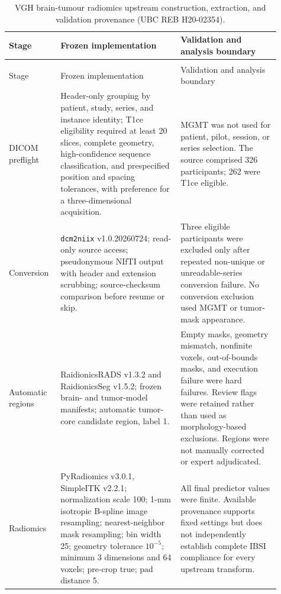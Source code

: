 \begingroup
\footnotesize
\setlength{\tabcolsep}{3.5pt}
\renewcommand{\arraystretch}{1.12}
\begin{longtable}{>{\raggedright\arraybackslash}p{0.16\linewidth}>{\raggedright\arraybackslash}p{0.41\linewidth}>{\raggedright\arraybackslash}p{0.34\linewidth}}
\caption{VGH brain-tumour radiomics upstream construction, extraction, and validation provenance (UBC REB H20-02354).}\label{tab:supp28}\\
\toprule
Stage & Frozen implementation & Validation and analysis boundary \\
\midrule
\endfirsthead
\multicolumn{3}{l}{\footnotesize\itshape \tablename~\thetable\ (continued)}\\
\toprule
Stage & Frozen implementation & Validation and analysis boundary \\
\midrule
\endhead
\bottomrule
\endfoot
DICOM preflight & Header-only grouping by patient, study, series, and instance identity; T1ce eligibility required at least 20 slices, complete geometry, high-confidence sequence classification, and prespecified position and spacing tolerances, with preference for a three-dimensional acquisition. & MGMT was not used for patient, pilot, session, or series selection. The source comprised 326 participants; 262 were T1ce eligible. \\
Conversion & \texttt{dcm2niix} v1.0.20260724; read-only source access; pseudonymous NIfTI output with header and extension scrubbing; source-checksum comparison before resume or skip. & Three eligible participants were excluded only after repeated non-unique or unreadable-series conversion failure. No conversion exclusion used MGMT or tumor-mask appearance. \\
Automatic regions & RaidionicsRADS v1.3.2 and RaidionicsSeg v1.5.2; frozen brain- and tumor-model manifests; automatic tumor-core candidate region, label 1. & Empty masks, geometry mismatch, nonfinite voxels, out-of-bounds masks, and execution failure were hard failures. Review flags were retained rather than used as morphology-based exclusions. Regions were not manually corrected or expert adjudicated. \\
Radiomics & PyRadiomics v3.0.1, SimpleITK v2.2.1; normalization scale 100; 1-mm isotropic B-spline image resampling; nearest-neighbor mask resampling; bin width 25; geometry tolerance $10^{-5}$; minimum 3 dimensions and 64 voxels; pre-crop true; pad distance 5. & All final predictor values were finite. Available provenance supports fixed settings but does not independently establish complete IBSI compliance for every upstream transform. \\

\end{longtable}
